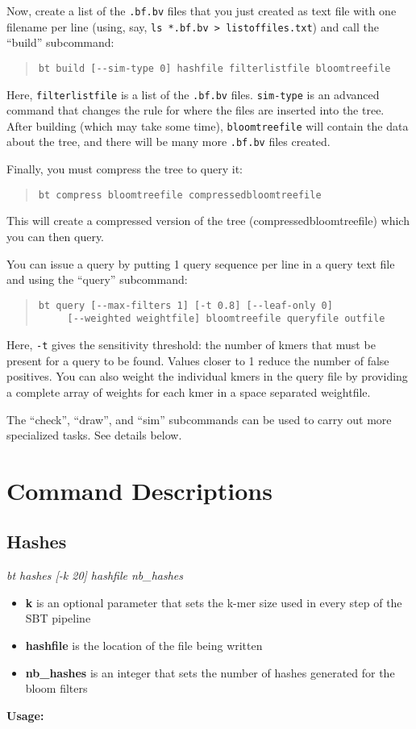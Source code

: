\documentclass{article}
\begin{document}
Now, create a list of the \verb+.bf.bv+ files that you just created as text file with one filename per line (using, say, \verb+ls *.bf.bv > listoffiles.txt+) and call the ``build'' subcommand:
\begin{quote}
\begin{verbatim}
bt build [--sim-type 0] hashfile filterlistfile bloomtreefile
\end{verbatim}
\end{quote}
Here, \verb+filterlistfile+ is a list of the \verb+.bf.bv+ files. \verb+sim-type+ is an advanced command that changes the rule for where the files are inserted into the tree. After building (which may take some time), \verb+bloomtreefile+ will contain the data about the tree, and there will be many more \verb+.bf.bv+ files created. 

Finally, you must compress the tree to query it:
\begin{quote}
\begin{verbatim}
bt compress bloomtreefile compressedbloomtreefile
\end{verbatim}
\end{quote}
This will create a compressed version of the tree (compressedbloomtreefile) which you can then query.

You can issue a query by putting 1 query sequence per line in a query text file and using the ``query'' subcommand:
\begin{quote}
\begin{lstlisting}
bt query [--max-filters 1] [-t 0.8] [--leaf-only 0] 
	 [--weighted weightfile] bloomtreefile queryfile outfile
\end{lstlisting}
\end{quote}
Here, \verb+-t+ gives the sensitivity threshold: the number of kmers that must be present for a query to be found. Values closer to 1 reduce the number of false positives. You can also weight the individual kmers in the query file by providing a complete array of weights for each kmer in a space separated weightfile.

The ``check'', ``draw'', and ``sim'' subcommands can be used to carry out more specialized tasks. See details below.

\section{Command Descriptions}

\subsection{Hashes} 
\textit{bt hashes [-k 20] hashfile nb\_hashes}
\begin{itemize}
\item \textbf{k} is an optional parameter that sets the k-mer size used in every step of the SBT pipeline
\item \textbf{hashfile} is the location of the file being written
\item \textbf{nb\_hashes} is an integer that sets the number of hashes generated for the bloom filters
\end{itemize}
\textbf{Usage:}
\end{document}

